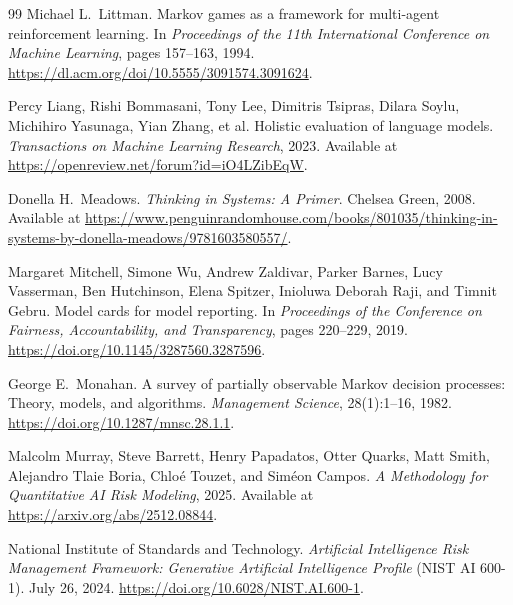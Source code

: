 \documentclass[11pt]{article}
\begin{document}
\begin{thebibliography}{99}
Michael L.~Littman.
Markov games as a framework for multi-agent reinforcement learning.
In \textit{Proceedings of the 11th International Conference on Machine Learning}, pages 157--163, 1994.
\url{https://dl.acm.org/doi/10.5555/3091574.3091624}.

Percy Liang, Rishi Bommasani, Tony Lee, Dimitris Tsipras, Dilara Soylu, Michihiro Yasunaga, Yian Zhang, et al.
Holistic evaluation of language models.
\textit{Transactions on Machine Learning Research}, 2023.
Available at \url{https://openreview.net/forum?id=iO4LZibEqW}.

Donella H.~Meadows.
\textit{Thinking in Systems: A Primer}.
Chelsea Green, 2008.
Available at \url{https://www.penguinrandomhouse.com/books/801035/thinking-in-systems-by-donella-meadows/9781603580557/}.

Margaret Mitchell, Simone Wu, Andrew Zaldivar, Parker Barnes, Lucy Vasserman, Ben Hutchinson, Elena Spitzer, Inioluwa Deborah Raji, and Timnit Gebru.
Model cards for model reporting.
In \textit{Proceedings of the Conference on Fairness, Accountability, and Transparency}, pages 220--229, 2019.
\url{https://doi.org/10.1145/3287560.3287596}.

George E.~Monahan.
A survey of partially observable Markov decision processes: Theory, models, and algorithms.
\textit{Management Science}, 28(1):1--16, 1982.
\url{https://doi.org/10.1287/mnsc.28.1.1}.

Malcolm Murray, Steve Barrett, Henry Papadatos, Otter Quarks, Matt Smith, Alejandro Tlaie Boria, Chloé Touzet, and Siméon Campos.
\textit{A Methodology for Quantitative AI Risk Modeling}, 2025.
Available at \url{https://arxiv.org/abs/2512.08844}.


National Institute of Standards and Technology.
\textit{Artificial Intelligence Risk Management Framework: Generative Artificial Intelligence Profile} (NIST AI 600-1).
July 26, 2024.
\url{https://doi.org/10.6028/NIST.AI.600-1}.


\end{thebibliography}
\end{document}
